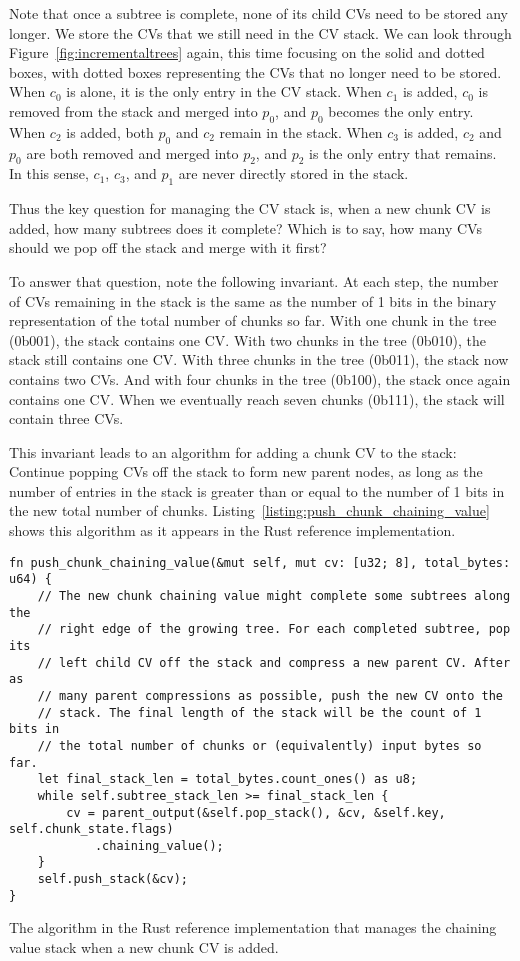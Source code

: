 \documentclass[12pt,notitlepage,a4paper]{article}
\begin{document}
Note that once a subtree is complete, none of its child CVs need to be stored
any longer. We store the CVs that we still need in the CV stack. We can look
through Figure~\ref{fig:incrementaltrees} again, this time focusing on the
solid and dotted boxes, with dotted boxes representing the CVs that no longer
need to be stored. When $c_0$ is alone, it is the only entry in the CV stack.
When $c_1$ is added, $c_0$ is removed from the stack and merged into $p_0$, and
$p_0$ becomes the only entry. When $c_2$ is added, both $p_0$ and $c_2$ remain
in the stack. When $c_3$ is added, $c_2$ and $p_0$ are both removed and merged
into $p_2$, and $p_2$ is the only entry that remains. In this sense, $c_1$,
$c_3$, and $p_1$ are never directly stored in the stack.

Thus the key question for managing the CV stack is, when a new chunk CV is
added, how many subtrees does it complete? Which is to say, how many CVs should
we pop off the stack and merge with it first?

To answer that question, note the following invariant. At each step, the number
of CVs remaining in the stack is the same as the number of 1 bits in the binary
representation of the total number of chunks so far. With one chunk in the tree
(0b001), the stack contains one CV. With two chunks in the tree (0b010), the
stack still contains one CV. With three chunks in the tree (0b011), the stack
now contains two CVs. And with four chunks in the tree (0b100), the stack once
again contains one CV. When we eventually reach seven chunks (0b111), the stack
will contain three CVs.

This invariant leads to an algorithm for adding a chunk CV to the stack:
Continue popping CVs off the stack to form new parent nodes, as long as the
number of entries in the stack is greater than or equal to the number of 1 bits
in the new total number of chunks.
Listing~\ref{listing:push_chunk_chaining_value} shows this algorithm as it
appears in the Rust reference implementation.

\begin{listing}[h]
\begin{verbatim}
fn push_chunk_chaining_value(&mut self, mut cv: [u32; 8], total_bytes: u64) {
    // The new chunk chaining value might complete some subtrees along the
    // right edge of the growing tree. For each completed subtree, pop its
    // left child CV off the stack and compress a new parent CV. After as
    // many parent compressions as possible, push the new CV onto the
    // stack. The final length of the stack will be the count of 1 bits in
    // the total number of chunks or (equivalently) input bytes so far.
    let final_stack_len = total_bytes.count_ones() as u8;
    while self.subtree_stack_len >= final_stack_len {
        cv = parent_output(&self.pop_stack(), &cv, &self.key, self.chunk_state.flags)
            .chaining_value();
    }
    self.push_stack(&cv);
}
\end{verbatim}
\caption{The algorithm in the Rust reference implementation that manages the
    chaining value stack when a new chunk CV is added.}
\label{listing:push_chunk_chaining_value}
\end{listing}
\end{document}
